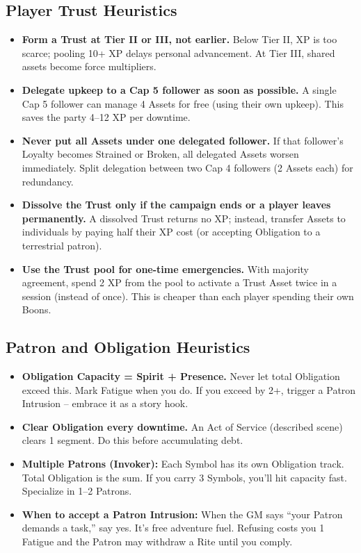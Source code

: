 \documentclass[11pt]{article}
\begin{document}
\subsection*{Player Trust Heuristics}
\begin{itemize}
  \item \textbf{Form a Trust at Tier II or III, not earlier.} Below Tier II, XP is too scarce; pooling 10+ XP delays personal advancement. At Tier III, shared assets become force multipliers.
  \item \textbf{Delegate upkeep to a Cap 5 follower as soon as possible.} A single Cap 5 follower can manage 4 Assets for free (using their own upkeep). This saves the party 4--12 XP per downtime.
  \item \textbf{Never put all Assets under one delegated follower.} If that follower's Loyalty becomes Strained or Broken, all delegated Assets worsen immediately. Split delegation between two Cap 4 followers (2 Assets each) for redundancy.
  \item \textbf{Dissolve the Trust only if the campaign ends or a player leaves permanently.} A dissolved Trust returns no XP; instead, transfer Assets to individuals by paying half their XP cost (or accepting Obligation to a terrestrial patron).
  \item \textbf{Use the Trust pool for one-time emergencies.} With majority agreement, spend 2 XP from the pool to activate a Trust Asset twice in a session (instead of once). This is cheaper than each player spending their own Boons.
\end{itemize}

\subsection*{Patron and Obligation Heuristics}

\begin{itemize}
    \item \textbf{Obligation Capacity = Spirit + Presence.} Never let total Obligation exceed this. Mark Fatigue when you do. If you exceed by 2+, trigger a Patron Intrusion -- embrace it as a story hook.
    \item \textbf{Clear Obligation every downtime.} An Act of Service (described scene) clears 1 segment. Do this before accumulating debt.
    \item \textbf{Multiple Patrons (Invoker):} Each Symbol has its own Obligation track. Total Obligation is the sum. If you carry 3 Symbols, you'll hit capacity fast. Specialize in 1--2 Patrons.
    \item \textbf{When to accept a Patron Intrusion:} When the GM says ``your Patron demands a task,'' say yes. It's free adventure fuel. Refusing costs you 1 Fatigue and the Patron may withdraw a Rite until you comply.
\end{itemize}
\end{document}
